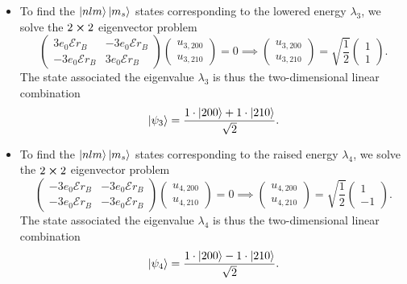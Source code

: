 \documentclass[11pt, a4paper]{article}
\newcommand{\p}{\psi}  %
\newcommand{\E}{\mathcal{E}}  %
\begin{document}
\begin{itemize}
	\item To find the $ \ket{nlm}\ket{m_{s}} $ states corresponding to the lowered energy $ \lambda_{3} $, we solve the $ 2 \cross 2 $ eigenvector problem
	\begin{equation*}
		\begin{pmatrix}
		3e_{0}\E r_{B} & -3e_{0}\E r_{B} \\
		- 3e_{0}\E r_{B} & 3e_{0}\E r_{B}
		\end{pmatrix}
		\begin{pmatrix}
			u_{3, 200}\\
			u_{3, 210}
		\end{pmatrix}
		 = 0
		\implies 
		\begin{pmatrix}
			u_{3, 200}\\
			u_{3, 210}
		\end{pmatrix} 
		 = \sqrt{\frac{1}{2}}
		 \begin{pmatrix}
		 1\\
		 1
		 \end{pmatrix}.
	\end{equation*}
	The state associated the eigenvalue $ \lambda_{3} $ is thus the two-dimensional linear combination
	\begin{equation*}
		\ket{\p_{3}} = \frac{1\cdot \ket{200} + 1\cdot \ket{210}}{\sqrt{2}}.
	\end{equation*}
	
	\item To find the $ \ket{nlm}\ket{m_{s}} $ states corresponding to the raised energy $ \lambda_{4} $, we solve the $ 2 \cross 2 $ eigenvector problem
	\begin{equation*}
		\begin{pmatrix}
		-3e_{0}\E r_{B} & -3e_{0}\E r_{B} \\
		-3e_{0}\E r_{B} & -3e_{0}\E r_{B}
		\end{pmatrix}
		\begin{pmatrix}
			u_{4, 200}\\
			u_{4, 210}
		\end{pmatrix}
		 = 0
		\implies 
		\begin{pmatrix}
			u_{4, 200}\\
			u_{4, 210}
		\end{pmatrix} 
	 = \sqrt{\frac{1}{2}}
	 \begin{pmatrix}
	 1\\
	 -1
	 \end{pmatrix}.
	\end{equation*}
	The state associated the eigenvalue $ \lambda_{4} $ is thus the two-dimensional linear combination
	\begin{equation*}
		\ket{\p_{4}} = \frac{1\cdot \ket{200} - 1\cdot \ket{210}}{\sqrt{2}}.
	\end{equation*}
\end{itemize}
	
\end{document}
